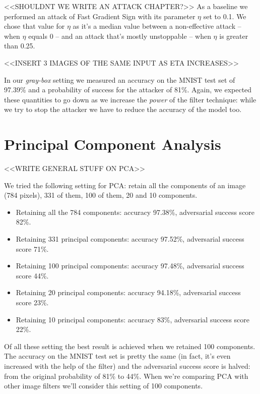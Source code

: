 <<SHOULDNT WE WRITE AN ATTACK CHAPTER?>> As a baseline we performed an
attack of Fast Gradient Sign with its parameter $\eta$ set to 0.1. We
chose that value for $\eta$ as it's a median value between a
non-effective attack -- when $\eta$ equals 0 -- and an attack that's
mostly unstoppable -- when $\eta$ is greater than 0.25.

<<INSERT 3 IMAGES OF THE SAME INPUT AS ETA INCREASES>>

In our \emph{gray-box} setting we measured an accuracy on the MNIST
test set of 97.39\% and a probability of success for the attacker of
81\%. Again, we expected these quantities to go down as we increase the
\emph{power} of the filter technique: while we try to stop the attacker
we have to reduce the accuracy of the model too.

\section{Principal Component Analysis}

<<WRITE GENERAL STUFF ON PCA>>

We tried the following setting for PCA: retain all the components of an
image (784 pixels), 331 of them, 100 of them, 20 and 10 components.

\begin{itemize}
  \item Retaining all the 784 components: accuracy 97.38\%, adversarial
    success score 82\%.
  \item Retaining 331 principal components: accuracy 97.52\%,
    adversarial success score 71\%.
  \item Retaining 100 principal components: accuracy 97.48\%,
    adversarial success score 44\%.
  \item Retaining 20 principal components: accuracy 94.18\%,
    adversarial success score 23\%.
  \item Retaining 10 principal components: accuracy 83\%, adversarial
    success score 22\%.
\end{itemize}

Of all these setting the best result is achieved when we retained 100
components. The accuracy on the MNIST test set is pretty the same (in
fact, it's even increased with the help of the filter) and the
adversarial success score is halved: from the original probability of
81\% to 44\%. When we're comparing PCA with other image filters we'll
consider this setting of 100 components.
